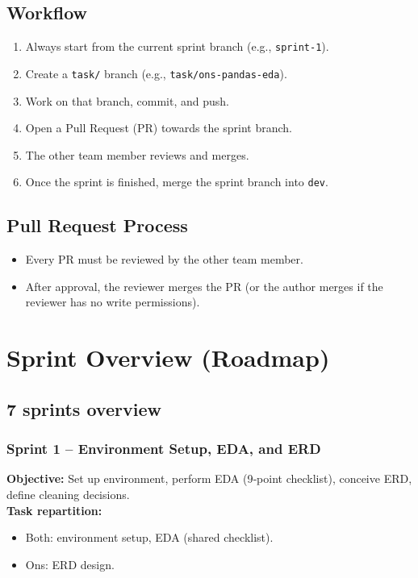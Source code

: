 \documentclass[12pt, a4paper]{report}
\begin{document}
\section{Workflow}
\begin{enumerate}[noitemsep, topsep=0pt]
   \item Always start from the current sprint branch (e.g., \texttt{sprint-1}).
   \item Create a \texttt{task/} branch (e.g., \texttt{task/ons-pandas-eda}).
   \item Work on that branch, commit, and push.
   \item Open a Pull Request (PR) towards the sprint branch.
   \item The other team member reviews and merges.
   \item Once the sprint is finished, merge the sprint branch into \texttt{dev}.
\end{enumerate}

\section{Pull Request Process}
\begin{itemize}[noitemsep, topsep=0pt]
   \item Every PR must be reviewed by the other team member.
   \item After approval, the reviewer merges the PR (or the author merges if the reviewer has no write permissions).
\end{itemize}

\chapter{Sprint Overview (Roadmap)}
\section{7 sprints overview}
\subsection*{Sprint 1 – Environment Setup, EDA, and ERD}
\textbf{Objective:} Set up environment, perform EDA (9‑point checklist), conceive ERD, define cleaning decisions. \\
\textbf{Task repartition:}
\begin{itemize}[noitemsep, topsep=0pt]
   \item Both: environment setup, EDA (shared checklist).
   \item Ons: ERD design.
\end{itemize}
\end{document}
